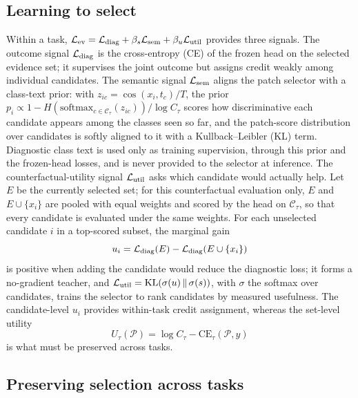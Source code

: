 \documentclass{article}
\def\L{{\cal L}}
\newcommand{\Cls}{\mathcal{C}}
\newcommand{\Psel}{\mathcal{P}}
\begin{document}
\subsection{Learning to select}
\label{ssec:within}

Within a task, $\L_{\mathrm{ev}}=\L_{\mathrm{diag}}+\beta_s\L_{\mathrm{sem}}+\beta_u\L_{\mathrm{util}}$ provides three signals. The outcome signal $\L_{\mathrm{diag}}$ is the cross-entropy (CE) of the frozen head on the selected evidence set; it supervises the joint outcome but assigns credit weakly among individual candidates. The semantic signal $\L_{\mathrm{sem}}$ aligns the patch selector with a class-text prior: with $z_{ic}=\cos(x_i,t_c)/T$, the prior $p_i\propto 1-H(\mathrm{softmax}_{c\in\Cls_\tau}(z_{ic}))/\log C_\tau$ scores how discriminative each candidate appears among the classes seen so far, and the patch-score distribution over candidates is softly aligned to it with a Kullback--Leibler (KL) term. Diagnostic class text is used only as training supervision, through this prior and the frozen-head losses, and is never provided to the selector at inference. The counterfactual-utility signal $\L_{\mathrm{util}}$ asks which candidate would actually help. Let $E$ be the currently selected set; for this counterfactual evaluation only, $E$ and $E\cup\{x_i\}$ are pooled with equal weights and scored by the head on $\Cls_\tau$, so that every candidate is evaluated under the same weights. For each unselected candidate $i$ in a top-scored subset, the marginal gain
\begin{equation}
u_i
=
\L_{\mathrm{diag}}(E)
-
\L_{\mathrm{diag}}(E\cup\{x_i\})
\label{eq:ui}
\end{equation}
is positive when adding the candidate would reduce the diagnostic loss; it forms a no-gradient teacher, and $\L_{\mathrm{util}}=\mathrm{KL}(\sigma(u)\,\Vert\,\sigma(s))$, with $\sigma$ the softmax over candidates, trains the selector to rank candidates by measured usefulness. The candidate-level $u_i$ provides within-task credit assignment, whereas the set-level utility
\begin{equation}
U_\tau(\Psel)=\log C_\tau-\mathrm{CE}_\tau(\Psel,y)
\label{eq:u}
\end{equation}
is what must be preserved across tasks.

\subsection{Preserving selection across tasks}
\label{ssec:cl}
\end{document}
